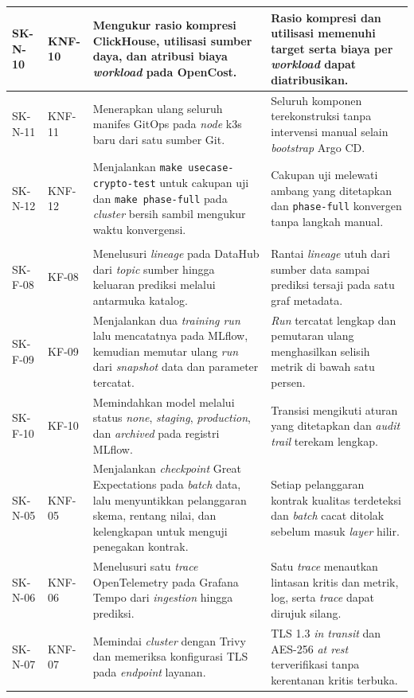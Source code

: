 {\begin{longtable}{|>{\centering\arraybackslash}m{1.4cm}|>{\centering\arraybackslash}m{1.75cm}|m{5.9cm}|m{4cm}|}
\hline
SK-N-10 & KNF-10 & Mengukur rasio kompresi ClickHouse, utilisasi sumber daya, dan atribusi biaya \textit{workload} pada OpenCost. & Rasio kompresi dan utilisasi memenuhi target serta biaya per \textit{workload} dapat diatribusikan. \\
\hline
SK-N-11 & KNF-11 & Menerapkan ulang seluruh manifes GitOps pada \textit{node} k3s baru dari satu sumber Git. & Seluruh komponen terekonstruksi tanpa intervensi manual selain \textit{bootstrap} Argo CD. \\
\hline
SK-N-12 & KNF-12 & Menjalankan \texttt{make usecase-crypto-test} untuk cakupan uji dan \texttt{make phase-full} pada \textit{cluster} bersih sambil mengukur waktu konvergensi. & Cakupan uji melewati ambang yang ditetapkan dan \texttt{phase-full} konvergen tanpa langkah manual. \\
\hline

\multicolumn{4}{|l|}{\textbf{Tujuan T-2: sub-sistem tata kelola data}} \\
\hline
SK-F-08 & KF-08 & Menelusuri \textit{lineage} pada DataHub dari \textit{topic} sumber hingga keluaran prediksi melalui antarmuka katalog. & Rantai \textit{lineage} utuh dari sumber data sampai prediksi tersaji pada satu graf metadata. \\
\hline
SK-F-09 & KF-09 & Menjalankan dua \textit{training run} lalu mencatatnya pada MLflow, kemudian memutar ulang \textit{run} dari \textit{snapshot} data dan parameter tercatat. & \textit{Run} tercatat lengkap dan pemutaran ulang menghasilkan selisih metrik di bawah satu persen. \\
\hline
SK-F-10 & KF-10 & Memindahkan model melalui status \textit{none}, \textit{staging}, \textit{production}, dan \textit{archived} pada registri MLflow. & Transisi mengikuti aturan yang ditetapkan dan \textit{audit trail} terekam lengkap. \\
\hline
SK-N-05 & KNF-05 & Menjalankan \textit{checkpoint} Great Expectations pada \textit{batch} data, lalu menyuntikkan pelanggaran skema, rentang nilai, dan kelengkapan untuk menguji penegakan kontrak. & Setiap pelanggaran kontrak kualitas terdeteksi dan \textit{batch} cacat ditolak sebelum masuk \textit{layer} hilir. \\
\hline
SK-N-06 & KNF-06 & Menelusuri satu \textit{trace} OpenTelemetry pada Grafana Tempo dari \textit{ingestion} hingga prediksi. & Satu \textit{trace} menautkan lintasan kritis dan metrik, log, serta \textit{trace} dapat dirujuk silang. \\
\hline
SK-N-07 & KNF-07 & Memindai \textit{cluster} dengan Trivy dan memeriksa konfigurasi TLS pada \textit{endpoint} layanan. & TLS 1.3 \textit{in transit} dan AES-256 \textit{at rest} terverifikasi tanpa kerentanan kritis terbuka. \\
\hline


\end{longtable}}
